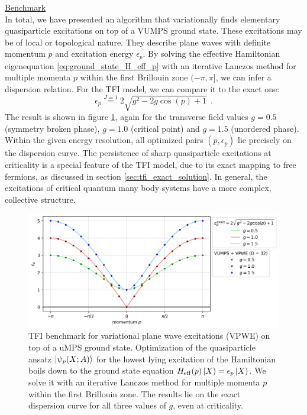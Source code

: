 \noindent \underline{Benchmark} \\[0.5em]
\noindent In total, we have presented an algorithm that variationally finds elementary quasiparticle excitations on top of a VUMPS ground state. These excitations may be of local or topological nature. They describe plane waves with definite momentum $p$ and excitation energy $\epsilon_p$. By solving the effective Hamiltonian eigenequation \eqref{eq:ground_state_H_eff_p} with an iterative Lanczos method for multiple momenta $p$ within the first Brillouin zone $(- \pi, \pi ]$, we can infer a dispersion relation. For the TFI model, we can compare it to the exact one:
\begin{equation}
	\epsilon_p \overset{J = 1}{=} 2\sqrt{g^2 - 2 g \cos(p) + 1} \:\:.
\end{equation}
The result is shown in figure \ref{fig:uexcitations_dispersion}, again for the transverse field values $g = 0.5$ (symmetry broken phase), $g = 1.0$ (critical point) and $g = 1.5$ (unordered phase). Within the given energy resolution, all optimized pairs $(p, \epsilon_p)$ lie precisely on the dispersion curve. The persistence of sharp quasiparticle excitations at criticality is a special feature of the TFI model, due to its exact mapping to free fermions, as discussed in section \ref{sec:tfi_exact_solution}. In general, the excitations of critical quantum many body systems have a more complex, collective structure.
\begin{figure}[t]
  \centering
  \includegraphics[width=1.0\linewidth]{uexcitations_dispersion.png}
  \caption{TFI benchmark for variational plane wave excitations (VPWE) on top of a uMPS ground state. Optimization of the quasiparticle ansatz $\ket{\psi_p(X; A)}$ for the lowest lying excitation of the Hamiltonian boils down to the ground state equation $H_{\mathrm{eff}}(p) \left| X \right) = \epsilon_p \left| X \right)$. We solve it with an iterative Lanczos method for multiple momenta $p$ within the first Brillouin zone. The results lie on the exact dispersion curve for all three values of $g$, even at criticality.}
\label{fig:uexcitations_dispersion}
\end{figure}